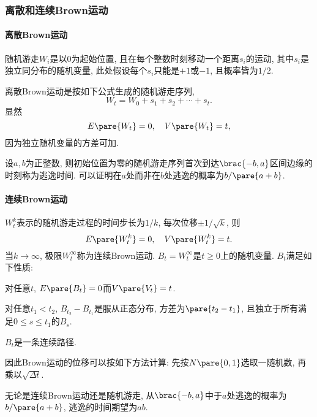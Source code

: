 \documentclass{ctexart}
\begin{document}

\subsubsection{离散和连续Brown运动} %
\label{ssub:离散和连续brown运动}

\paragraph{离散Brown运动} %
\label{par:离散brown运动}

随机游走$W_i$是以$0$为起始位置, 且在每个整数时刻移动一个距离$s_i$的运动, 其中$s_i$是独立同分布的随机变量, 此处假设每个$s_i$只能是$+1$或$-1$, 且概率皆为$1/2$.
\par
离散Brown运动是按如下公式生成的随机游走序列,
\[ W_t = W_0 + s_1 + s_2 + \cdots + s_t. \]
显然
\[ E\pare{W_t} = 0,\quad V\pare{W_t} = t, \]
因为独立随机变量的方差可加.
\par
设$a,b$为正整数, 则初始位置为零的随机游走序列首次到达$\brac{-b,a}$区间边缘的时刻称为逃逸时间. 可以证明在$a$处而非在$b$处逃逸的概率为$b/\pare{a+b}$.


\paragraph{连续Brown运动} %
\label{par:连续brown运动}

$W_t^k$表示的随机游走过程的时间步长为$1/k$, 每次位移$\pm 1/\sqrt{k}$, 则
\[ E\pare{W_t^k} = 0,\quad V\pare{W_t^k} = t. \]
当$k\rightarrow \infty$, 极限$W_t^\infty$称为连续Brown运动. $B_t = W_t^\infty$是$t\ge 0$上的随机变量. $B_t$满足如下性质:
\begin{cenum}
    \item 对任意$t$, $E\pare{B_t} = 0$而$V\pare{V_t} = t$.
    \item 对任意$t_1 < t_2$, $B_{t_2} - B_{t_1}$是服从正态分布, 方差为$\pare{t_2 - t_1}$, 且独立于所有满足$0\le s \le t_1$的$B_s$.
    \item $B_t$是一条连续路径.
\end{cenum}
因此Brown运动的位移可以按如下方法计算: 先按$N\pare{0,1}$选取一随机数, 再乘以$\sqrt{\Delta t}$.
\par
无论是连续Brown运动还是随机游走, 从$\brac{-b,a}$中于$a$处逃逸的概率为$b/\pare{a+b}$, 逃逸的时间期望为$ab$.

\end{document}
